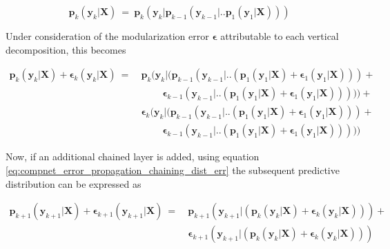\begin{equation}
\label{eq:compnet_error_propagation_chaining_dist}
    \textbf{p}_k(\textbf{y}_k|\textbf{X})\ =\ \textbf{p}_k(\textbf{y}_k|\textbf{p}_{k-1}(\textbf{y}_{k-1}|..\textbf{p}_1(\textbf{y}_1|\textbf{X})))
\end{equation}

Under consideration of the modularization error $\boldsymbol{\epsilon}$ attributable to each vertical decomposition, this becomes

\begin{equation}
\label{eq:compnet_error_propagation_chaining_dist_err}
\begin{split}
    \textbf{p}_k(\textbf{y}_k|\textbf{X})+\boldsymbol{\epsilon}_k(\textbf{y}_k|\textbf{X})\ =\ &
    \textbf{p}_k(\textbf{y}_k|(\textbf{p}_{k-1}(\textbf{y}_{k-1}|..(\textbf{p}_1(\textbf{y}_1|\textbf{X})+\boldsymbol{\epsilon}_1(\textbf{y}_{1}|\textbf{X})))+\\
    &\ \ \ \ \ \ \ \ \ \ \boldsymbol{\epsilon}_{k-1}(\textbf{y}_{k-1}|..(\textbf{p}_1(\textbf{y}_1|\textbf{X})+\boldsymbol{\epsilon}_1(\textbf{y}_{1}|\textbf{X})))))+\\
    &\boldsymbol{\epsilon}_k(\textbf{y}_k|(\textbf{p}_{k-1}(\textbf{y}_{k-1}|..(\textbf{p}_1(\textbf{y}_1|\textbf{X})+\boldsymbol{\epsilon}_1(\textbf{y}_{1}|\textbf{X})))+\\
    &\ \ \ \ \ \ \ \ \ \ \boldsymbol{\epsilon}_{k-1}(\textbf{y}_{k-1}|..(\textbf{p}_1(\textbf{y}_1|\textbf{X})+\boldsymbol{\epsilon}_1(\textbf{y}_{1}|\textbf{X})))))
\end{split}
\end{equation}

Now, if an additional chained layer is added, using equation \ref{eq:compnet_error_propagation_chaining_dist_err} the subsequent predictive distribution can be expressed as

\begin{equation}
\label{eq:compnet_error_propagation_chaining_dist_additional_layer}
\begin{split}
    \textbf{p}_{k+1}(\textbf{y}_{k+1}|\textbf{X})+\boldsymbol{\epsilon}_{k+1}(\textbf{y}_{k+1}|\textbf{X})\ =\ &
    \textbf{p}_{k+1}(\textbf{y}_{k+1}|(\textbf{p}_k(\textbf{y}_k|\textbf{X})+\boldsymbol{\epsilon}_k(\textbf{y}_k|\textbf{X})))+\\
    & \boldsymbol{\epsilon}_{k+1}(\textbf{y}_{k+1}|(\textbf{p}_k(\textbf{y}_k|\textbf{X})+\boldsymbol{\epsilon}_k(\textbf{y}_k|\textbf{X})))
\end{split}
\end{equation}

